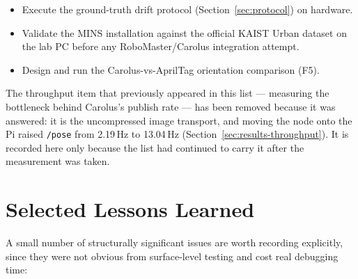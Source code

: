 \documentclass[11pt]{article}
\begin{document}
\begin{itemize}
  45--55\textdegree{} band. That verdict was wrong: the sweep instrument
  producing it was itself still testing the six-candidate algorithm after
  production had moved on. Re-run correctly, and extended to all
  \textbf{24} assignments, the median error is 3--6$\times$ lower at every
  angle from 5\textdegree{} to 55\textdegree{} and the failure rate above
  60\textdegree{} goes from 15--53\,\% to zero. It is now the default on
  both stacks. The 55\textdegree{} operating envelope described above
  therefore constrains the \emph{old} single-guess sort, not the shipped
  one. \textbf{The instrument, not the fix, was the thing that had drifted}
  --- and nothing in the original measurement could have revealed that.
  \item Execute the ground-truth drift protocol (Section~\ref{sec:protocol})
  on hardware.
  \item Validate the MINS installation against the official KAIST Urban
  dataset on the lab PC before any RoboMaster/Carolus integration attempt.
  \item Design and run the Carolus-vs-AprilTag orientation comparison (F5).
\end{itemize}

The throughput item that previously appeared in this list --- measuring the
bottleneck behind Carolus's publish rate --- has been removed because it was
answered: it is the uncompressed image transport, and moving the node onto
the Pi raised \texttt{/pose} from 2.19\,Hz to 13.04\,Hz
(Section~\ref{sec:results-throughput}). It is recorded here only because the
list had continued to carry it after the measurement was taken.

\section{Selected Lessons Learned}
\label{sec:lessons}

A small number of structurally significant issues are worth recording
explicitly, since they were not obvious from surface-level testing and cost
real debugging time:
\end{document}
